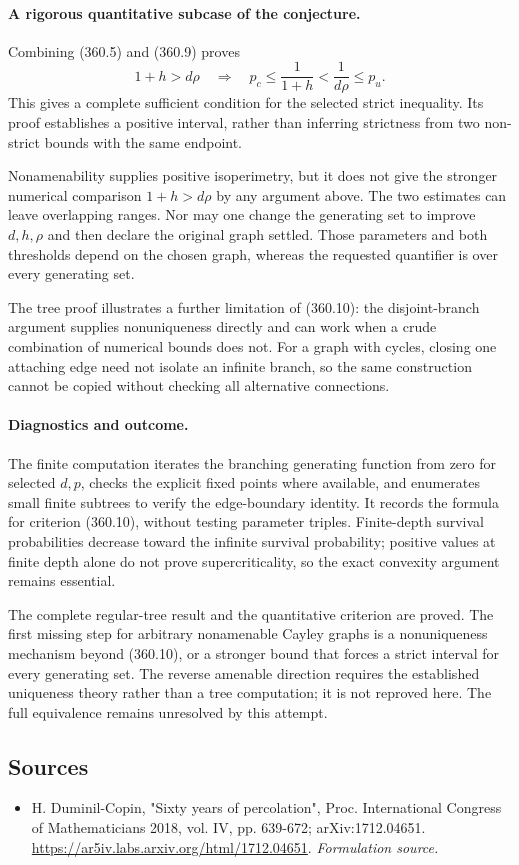 \documentclass[11pt]{article}
\begin{document}
\paragraph{A rigorous quantitative subcase of the conjecture.}
Combining (360.5) and (360.9) proves
\[
 1+h>d\rho\quad\Longrightarrow\quad
 p_c\leq\frac1{1+h}<\frac1{d\rho}\leq p_u.
 \tag{360.10}
\]
This gives a complete sufficient condition for the selected strict
inequality. Its proof establishes a positive interval, rather than
inferring strictness from two non-strict bounds with the same
endpoint.

Nonamenability supplies positive isoperimetry, but it does not give
the stronger numerical comparison $1+h>d\rho$ by any argument
above. The two estimates can leave overlapping ranges. Nor may
one change the generating set to improve $d,h,\rho$ and then
declare the original graph settled. Those parameters and both
thresholds depend on the chosen graph, whereas the requested
quantifier is over every generating set.

The tree proof illustrates a further limitation of (360.10): the
disjoint-branch argument supplies nonuniqueness directly and can
work when a crude combination of numerical bounds does not.
For a graph with cycles, closing one attaching edge need not
isolate an infinite branch, so the same construction cannot be
copied without checking all alternative connections.

\paragraph{Diagnostics and outcome.}
The finite computation iterates the branching generating function
from zero for selected $d,p$, checks the explicit fixed points
where available, and enumerates small finite subtrees to verify
the edge-boundary identity. It records the formula for criterion
(360.10), without testing parameter triples. Finite-depth
survival probabilities decrease toward the infinite survival
probability; positive values at finite depth alone do not prove
supercriticality, so the exact convexity argument remains essential.

The complete regular-tree result and the quantitative criterion are
proved. The first missing step for arbitrary nonamenable Cayley
graphs is a nonuniqueness mechanism beyond (360.10), or a stronger
bound that forces a strict interval for every generating set.
The reverse amenable direction requires the established uniqueness
theory rather than a tree computation; it is not reproved here.
The full equivalence remains unresolved by this attempt.
\subsection{Sources}
\begin{itemize}
\item[S1]H. Duminil-Copin, "Sixty years of percolation", Proc. International Congress of Mathematicians 2018, vol. IV, pp. 639-672; arXiv:1712.04651.
\url{https://ar5iv.labs.arxiv.org/html/1712.04651}.
\textit{Formulation source.}
\end{itemize}
\end{document}
